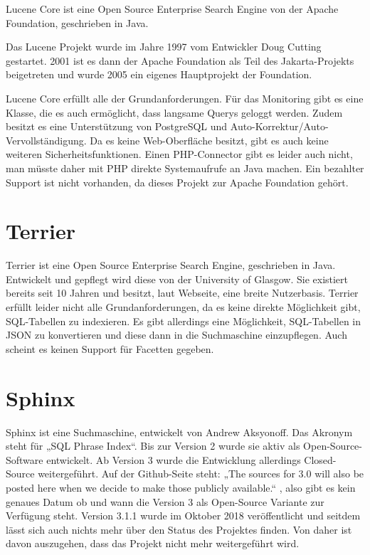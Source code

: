 Lucene Core ist eine Open Source Enterprise Search Engine von der Apache Foundation, geschrieben in Java.

Das Lucene Projekt wurde im Jahre 1997 vom Entwickler Doug Cutting gestartet. 2001 ist es dann der Apache Foundation als Teil des Jakarta-Projekts beigetreten und wurde 2005 ein eigenes Hauptprojekt der Foundation. \cite{Wikipedia.2019c}

Lucene Core erfüllt alle der Grundanforderungen. Für das Monitoring gibt es eine Klasse, die es auch ermöglicht, dass langsame Querys geloggt werden. Zudem besitzt es eine Unterstützung von PostgreSQL und Auto-Korrektur/Auto-Vervollständigung. Da es keine Web-Oberfläche besitzt, gibt es auch keine weiteren Sicherheitsfunktionen. Einen PHP-Connector gibt es leider auch nicht, man müsste daher mit PHP direkte Systemaufrufe an Java machen. Ein bezahlter Support ist nicht vorhanden, da dieses Projekt zur Apache Foundation gehört. \cite{TheApacheSoftwareFoundation.2019b}

\section{Terrier}
\label{terrier}

Terrier ist eine Open Source Enterprise Search Engine, geschrieben in Java. Entwickelt und gepflegt wird diese von der University of Glasgow. Sie existiert bereits seit 10 Jahren und besitzt, laut Webseite, eine breite Nutzerbasis. 
Terrier erfüllt leider nicht alle Grundanforderungen, da es keine direkte Möglichkeit gibt, SQL-Tabellen zu indexieren. Es gibt allerdings eine Möglichkeit, SQL-Tabellen in JSON zu konvertieren und diese dann in die Suchmaschine einzupflegen. Auch scheint es keinen Support für Facetten gegeben.
\cite{McCreadie.2019}

\section{Sphinx}
\label{sphinx}

Sphinx ist eine Suchmaschine, entwickelt von Andrew Aksyonoff. Das Akronym steht für „SQL Phrase Index“.\cite{SphinxTechnologiesInc.b} Bis zur Version 2 wurde sie aktiv als Open-Source-Software entwickelt. Ab Version 3 wurde die Entwicklung allerdings Closed-Source weitergeführt. Auf der Github-Seite steht: „The sources for 3.0 will also be posted here when we decide to make those publicly available.“ \cite{sphinxserach.2019}, also gibt es kein genaues Datum ob und wann die Version 3 als Open-Source Variante zur Verfügung steht. Version 3.1.1 wurde im Oktober 2018 veröffentlicht und seitdem lässt sich auch nichts mehr über den Status des Projektes finden. Von daher ist davon auszugehen, dass das Projekt nicht mehr weitergeführt wird. 

